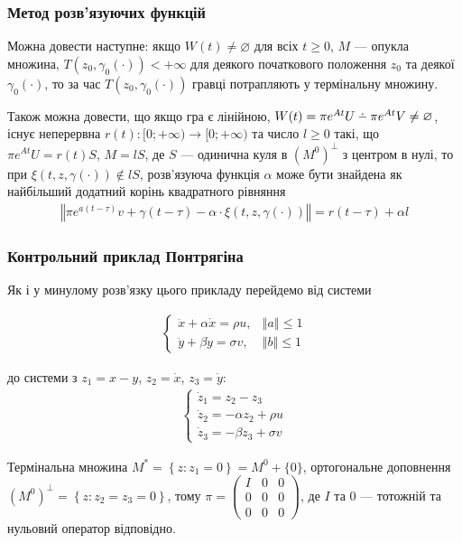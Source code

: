 \documentclass[10pt,pdf,aspectratio=169]{beamer}
\renewcommand{\d}[1]{\dot{#1}}
\newcommand{\dd}[1]{\ddot{#1}}
\renewcommand{\l}{\left}
\renewcommand{\r}{\right}
\newcommand{\norm}[1]{\left\Vert #1 \right\Vert}
\def\setdif{\mathbin{\ooalign{\hss\raise1ex\hbox{.}\hss\cr
  \mathsurround=0pt$-$}}}
\begin{document}
    \begin{frame}
        \frametitle{Метод розв’язуючих функцій}
    
        Можна довести наступне: якщо $W(t) \neq \varnothing$ для всіх $t\geq 0$,
        $M$ --- опукла множина, $T(z_0, \gamma_0(\cdot)) < +\infty$ для деякого початкового положення
        $z_0$ та деякої $\gamma_0(\cdot)$, то за час $T(z_0, \gamma_0(\cdot))$ гравці потрапляють у термінальну множину.

        Також можна довести, що якщо гра є лінійною,
        $W(t) = \pi e^{At}U \setdif \pi e^{At} V \neq \varnothing$, існує неперервна 
        $r(t): [0; +\infty) \to [0; +\infty)$ та число $l \geq 0$ такі, що
        $\pi e^{A t}U = r(t) S$, $M = l S$, де $S$ --- одинична куля в $(M^0)^\perp$ з центром в нулі, то
        при $\xi(t, z, \gamma(\cdot)) \notin l S$, розв'язуюча функція $\alpha$ може бути знайдена як найбільший додатний корінь квадратного рівняння
        \begin{gather*}
            \norm{\pi e^{a(t-\tau)}v + \gamma(t-\tau) - \alpha \cdot \xi(t, z, \gamma(\cdot))} = r(t-\tau) + \alpha l
        \end{gather*}
    
    \end{frame}
    \begin{frame}
        \frametitle{Контрольний приклад Понтрягіна}
    
        Як і у минулому розв’язку цього прикладу перейдемо від системи
    
        \begin{gather*}
            \begin{cases}
                \dd{x} + \alpha \d{x} = \rho u, & \norm{a} \leq 1 \\
                \dd{y} + \beta \d{y} = \sigma v, & \norm{b} \leq 1
            \end{cases}
        \end{gather*}

        до системи з $z_1 = x - y$, $z_2 = \d{x}$, $z_3 = \d{y}$:
        \begin{gather*}
            \begin{cases}
                \d{z}_1 = z_2 - z_3 \\
                \d{z}_2 = -\alpha z_2 + \rho u \\
                \d{z}_3 = -\beta z_3 + \sigma v
            \end{cases}
        \end{gather*}

        Термінальна множина $M^* = \l\{z: z_1 = 0 \r\} = M^0 + \{0\}$, ортогональне доповнення
        $(M^0)^\perp =\l\{z: z_2 = z_3 = 0 \r\}$, тому $\pi = \begin{pmatrix}
            I & 0 & 0 \\
            0 & 0 & 0 \\
            0 & 0 & 0
        \end{pmatrix}$, де $I$ та $0$ --- тотожній та нульовий оператор відповідно.

    \end{frame}
\end{document}
